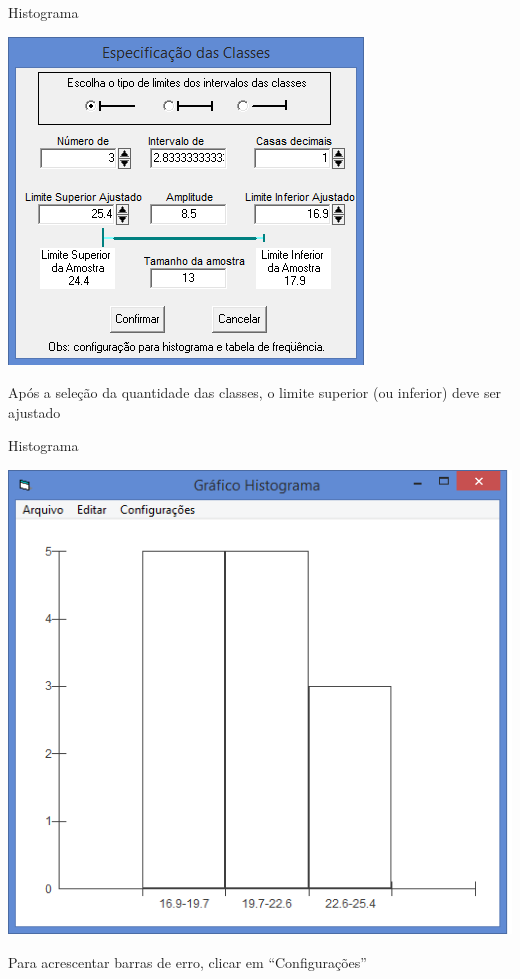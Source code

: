 \documentclass{beamer}
\begin{document}

\begin{frame}{Histograma}
  \begin{center}
    \includegraphics[height=0.7\textheight]{histograma3}
  \end{center}

  Após a seleção da quantidade das classes, o limite superior (ou
  inferior) deve ser ajustado
\end{frame}

\begin{frame}{Histograma}
  \begin{center}
    \includegraphics[height=0.7\textheight]{histograma4}
  \end{center}

  Para acrescentar barras de erro, clicar em ``Configurações''
\end{frame}
\end{document}
